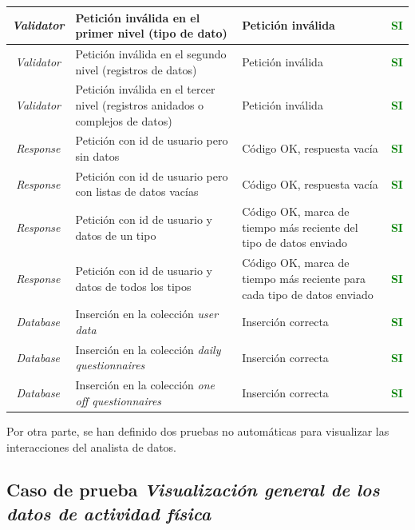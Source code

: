 \begin{xltabular}{\textwidth}{|c|X|X|c|}
            \hline
            \textit{Validator} & Petición inválida en el primer nivel (tipo de dato) & Petición inválida & \textcolor{green}{\textbf{SI}} \\
            \hline
            \textit{Validator} & Petición inválida en el segundo nivel (registros de datos) & Petición inválida & \textcolor{green}{\textbf{SI}} \\
            \hline
            \textit{Validator} & Petición inválida en el tercer nivel (registros anidados o complejos de datos) & Petición inválida & \textcolor{green}{\textbf{SI}} \\
            \hline
            \textit{Response} & Petición con id de usuario pero sin datos & Código OK, respuesta vacía & \textcolor{green}{\textbf{SI}} \\
            \hline
            \textit{Response} & Petición con id de usuario pero con listas de datos vacías & Código OK, respuesta vacía & \textcolor{green}{\textbf{SI}} \\
            \hline
            \textit{Response} & Petición con id de usuario y datos de un tipo & Código OK, marca de tiempo más reciente del tipo de datos enviado & \textcolor{green}{\textbf{SI}} \\
            \hline
            \textit{Response} & Petición con id de usuario y datos de todos los tipos & Código OK, marca de tiempo más reciente para cada tipo de datos enviado & \textcolor{green}{\textbf{SI}} \\
            \hline
            \textit{Database} & Inserción en la colección \textit{user data} & Inserción correcta & \textcolor{green}{\textbf{SI}} \\
            \hline
            \textit{Database} & Inserción en la colección \textit{daily questionnaires} & Inserción correcta & \textcolor{green}{\textbf{SI}} \\
            \hline
            \textit{Database} & Inserción en la colección \textit{one off questionnaires} & Inserción correcta & \textcolor{green}{\textbf{SI}} \\
            \hline
        \end{xltabular}

        Por otra parte, se han definido dos pruebas no automáticas para visualizar las interacciones del analista de datos.
        
        \subsection*{Caso de prueba \textit{Visualización general de los datos de actividad física}}

